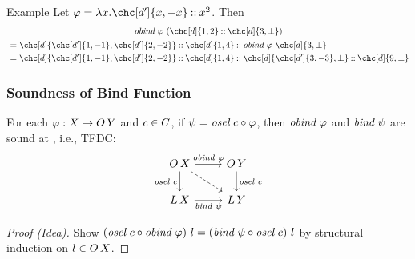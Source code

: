 \documentclass[draft,notes=show,xcolor=dvipsnames]{beamer}
\begin{document}
\begin{frame}
\begin{exampleblock}{Example}
    Let $\varphi = \lam{x}{\chc[\dE']{x, -x} \cons x^2}$. Then
    \begin{multline*}
      \obind\ \varphi\ (\chc[\dE]{1, 2} \cons \chc[\dE]{3, \bot}) \\
      \begin{aligned}
        &= \chc[\dE]{\chc[\dE']{1, -1}, \chc[\dE']{2, -2}} \cons \chc[\dE]{1, 4} \cons \obind\ \varphi\ \chc[\dE]{3, \bot} \\
        &= \chc[\dE]{\chc[\dE']{1, -1}, \chc[\dE']{2, -2}} \cons \chc[\dE]{1, 4} \cons \chc[\dE]{\chc[\dE']{3, -3}, \bot} \cons \chc[\dE]{9, \bot}
      \end{aligned}
    \end{multline*}
  \end{exampleblock}
\end{frame}

\begin{frame}[fragile]
  \frametitle{Soundness of Bind Function}
  \begin{theorem}
    For each \alert<2>{$\varphi : \Val \to \OLst[\ValY]$} and \alert<2>{$\cE \in \cS$}, if \alert<2>{$\psi = \osel\ \cE \comp \varphi$}, then \alert<3>{$\obind\ \varphi$} and \alert<3>{$\lbind\ \psi$} are sound \alert<3>{at \cE}, i.e., TFDC:
    $$
      \begin{tikzcd}
        \OLst \ar[d, "\osel\ \cE"'] \ar[r, "\obind\ \varphi"] \ar[dr, dashed] &
        \OLst[\ValY] \ar[d, "\osel\ \cE"] \\
        \Lst \ar[r, "\lbind\ \psi"'] &
        \Lst[\ValY]
      \end{tikzcd}
    $$
  \end{theorem}
  \begin{proof}[Proof (Idea)]
    Show
    $
      (\osel\ \cE \comp \obind\ \varphi)\ \lst =
      (\lbind\ \psi \comp \osel\ \cE)\ \lst
    $
    by structural induction on $\lst \in \OLst$.
  \end{proof}
\end{frame}
\end{document}
